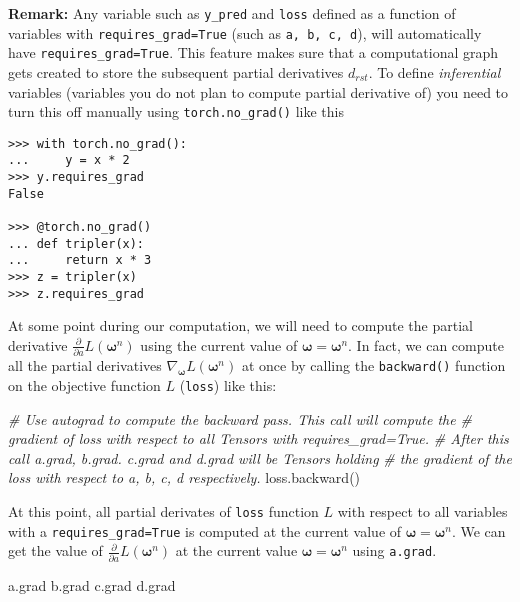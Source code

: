 \documentclass[
]{article}
\newenvironment{Shaded}{}{}
\newcommand{\CommentTok}[1]{\textcolor[rgb]{0.38,0.63,0.69}{\textit{#1}}}
\newcommand{\NormalTok}[1]{#1}
\begin{document}
\textbf{Remark:} Any variable such as \texttt{y\_pred} and \texttt{loss}
defined as a function of variables with \texttt{requires\_grad=True}
(such as \texttt{a,\ b,\ c,\ d}), will automatically have
\texttt{requires\_grad=True}. This feature makes sure that a
computational graph gets created to store the subsequent partial
derivatives \(d_{rst}\). To define \emph{inferential} variables
(variables you do not plan to compute partial derivative of) you need to
turn this off manually using \texttt{torch.no\_grad()} like this

\begin{verbatim}
>>> with torch.no_grad():
...     y = x * 2
>>> y.requires_grad
False

>>> @torch.no_grad()
... def tripler(x):
...     return x * 3
>>> z = tripler(x)
>>> z.requires_grad
\end{verbatim}

At some point during our computation, we will need to compute the
partial derivative
\(\frac{\partial}{\partial a}L(\boldsymbol{\omega}^n)\) using the
current value of \(\boldsymbol{\omega}= \boldsymbol{\omega}^n\). In
fact, we can compute all the partial derivatives
\(\nabla_{\boldsymbol{\omega}} L(\boldsymbol{\omega}^n)\) at once by
calling the \texttt{backward()} function on the objective function \(L\)
(\texttt{loss}) like this:

\begin{Shaded}
\begin{Highlighting}[]
\CommentTok{\# Use autograd to compute the backward pass. This call will compute the}
\CommentTok{\# gradient of loss with respect to all Tensors with requires\_grad=True.}
\CommentTok{\# After this call a.grad, b.grad. c.grad and d.grad will be Tensors holding}
\CommentTok{\# the gradient of the loss with respect to a, b, c, d respectively.}
\NormalTok{loss.backward()}
\end{Highlighting}
\end{Shaded}

At this point, all partial derivates of \texttt{loss} function \(L\)
with respect to all variables with a \texttt{requires\_grad=True} is
computed at the current value of
\(\boldsymbol{\omega}= \boldsymbol{\omega}^n\). We can get the value of
\(\frac{\partial}{\partial a}L(\boldsymbol{\omega}^n)\) at the current
value \(\boldsymbol{\omega}= \boldsymbol{\omega}^n\) using
\texttt{a.grad}.

\begin{Shaded}
\begin{Highlighting}[]
\NormalTok{a.grad}
\NormalTok{b.grad}
\NormalTok{c.grad}
\NormalTok{d.grad}
\end{Highlighting}
\end{Shaded}
\end{document}
